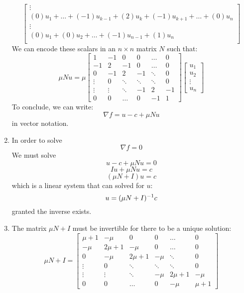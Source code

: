 \documentclass[12pt]{article}
\begin{document}
\begin{enumerate}[label=\alph*)]
\[\begin{bmatrix}
            \vdots \\
            (0)u_1 + \dots + (-1)u_{k-1} + (2)u_k
            + (-1)u_{k+1} + \dots + (0)u_n \\
            \vdots \\
            (0)u_1 + (0)u_{2} + \dots + 
            (-1)u_{n-1} + (1)u_{n} \\
        \end{bmatrix}  \]
        We can encode these scalars in an
        $n \times n$ matrix $N$ such that:
        \[ \mu Nu = 
        \mu \begin{bmatrix}
            1 & -1 & 0 & 0 & \dots & 0 \\ 
            -1 & 2 & -1 & 0 & \dots & 0 \\
            0 & -1 & 2 & -1 & \ddots & 0 \\
            \vdots & 0 & \ddots & \ddots & \ddots & 0 \\
            \vdots & \vdots & \ddots & -1 & 2 & -1 \\
            0 & 0 & \dots & 0 & -1 & 1
        \end{bmatrix}
        \begin{bmatrix}
            u_1 \\ u_2 \\ \vdots \\ u_n
        \end{bmatrix} \]
        To conclude,
        we can write:
        \[ \nabla f = u - c + \mu Nu \]
        in vector notation.
        \item 
        In order to solve
        \[ \nabla f = 0 \]
        We must solve
        \[  u - c + \mu Nu = 0 \]
        \[  Iu + \mu Nu = c \]
        \[  (\mu N + I)u = c \]
        which is a linear system that can solved
        for $u$:
        \[ u =  (\mu N + I)^{-1} c \]
        granted the inverse exists.
        \item 
        The matrix $\mu N + I$ must be invertible
        for there to be a unique solution:
        \[ \mu N + I = 
        \begin{bmatrix}
            \mu+1 & -\mu & 0 & 0 & \dots & 0 \\ 
            -\mu & 2\mu + 1 & -\mu & 0 & \dots & 0 \\
            0 & -\mu & 2\mu + 1 & -\mu & \ddots & 0 \\
            \vdots & 0 & \ddots & \ddots & \ddots & 0 \\
            \vdots & \vdots & \ddots & -\mu 
            & 2\mu + 1 & -\mu \\
            0 & 0 & \dots & 0 & -\mu & \mu + 1
        \end{bmatrix}
        \]
    \end{enumerate}
    
\end{document}
